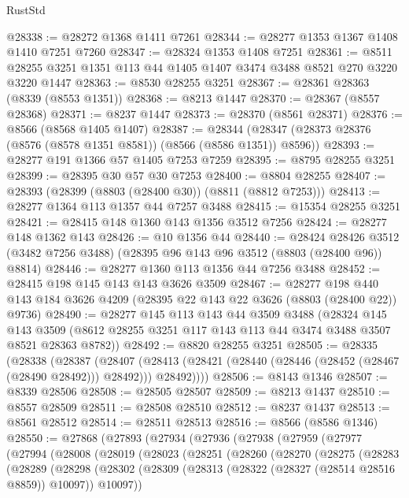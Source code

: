 \begin{lexlean}{RustStd}
\begin{coremodule}
@28338 := @28272 @1368 @1411 @7261
@28344 := @28277 @1353 @1367 @1408 @1410 @7251 @7260
@28347 := @28324 @1353 @1408 @7251
@28361 := @8511 @28255 @3251 @1351 @113 @44 @1405 @1407 @3474 @3488 @8521 @270 @3220 @3220 @1447
@28363 := @8530 @28255 @3251
@28367 := @28361 @28363 (@8339 (@8553 @1351))
@28368 := @8213 @1447
@28370 := @28367 (@8557 @28368)
@28371 := @8237 @1447
@28373 := @28370 (@8561 @28371)
@28376 := @8566 (@8568 @1405 @1407)
@28387 := @28344 (@28347 (@28373 @28376 (@8576 (@8578 @1351 @8581)) (@8566 (@8586 @1351)) @8596))
@28393 := @28277 @191 @1366 @57 @1405 @7253 @7259
@28395 := @8795 @28255 @3251
@28399 := @28395 @30 @57 @30 @7253
@28400 := @8804 @28255
@28407 := @28393 (@28399 (@8803 (@28400 @30)) (@8811 (@8812 @7253)))
@28413 := @28277 @1364 @113 @1357 @44 @7257 @3488
@28415 := @15354 @28255 @3251
@28421 := @28415 @148 @1360 @143 @1356 @3512 @7256
@28424 := @28277 @148 @1362 @143
@28426 := @10 @1356 @44
@28440 := @28424
    @28426
    @3512
    (@3482 @7256 @3488)
    (@28395 @96 @143 @96 @3512 (@8803 (@28400 @96)) @8814)
@28446 := @28277 @1360 @113 @1356 @44 @7256 @3488
@28452 := @28415 @198 @145 @143 @143 @3626 @3509
@28467 := @28277
    @198
    @440
    @143
    @184
    @3626
    @4209
    (@28395 @22 @143 @22 @3626 (@8803 (@28400 @22)) @9736)
@28490 := @28277
    @145
    @113
    @143
    @44
    @3509
    @3488
    (@28324
      @145
      @143
      @3509
      (@8612 @28255 @3251 @117 @143 @113 @44 @3474 @3488 @3507 @8521 @28363 @8782))
@28492 := @8820 @28255 @3251
@28505 := @28335
    (@28338
      (@28387
        (@28407
          (@28413 (@28421 (@28440 (@28446 (@28452 (@28467 (@28490 @28492))) @28492))) @28492))))
@28506 := @8143 @1346
@28507 := @8339 @28506
@28508 := @28505 @28507
@28509 := @8213 @1437
@28510 := @8557 @28509
@28511 := @28508 @28510
@28512 := @8237 @1437
@28513 := @8561 @28512
@28514 := @28511 @28513
@28516 := @8566 (@8586 @1346)
@28550 := @27868
    (@27893
      (@27934
        (@27936
          (@27938
            (@27959
              (@27977
                (@27994
                  (@28008
                    (@28019
                      (@28023
                        (@28251
                          (@28260
                            (@28270
                              (@28275
                                (@28283
                                  (@28289
                                    (@28298
                                      (@28302
                                        (@28309
                                          (@28313 (@28322 (@28327 (@28514 @28516 @8859)) @10097))
                                          @10097))

\end{coremodule}
\end{lexlean}
